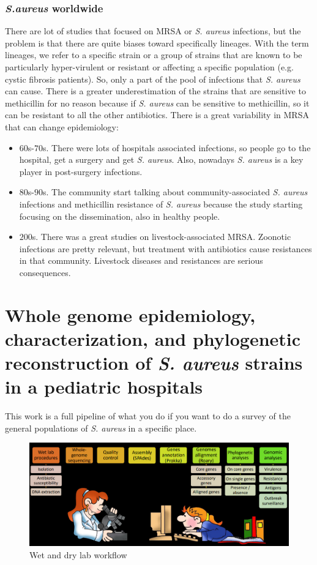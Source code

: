 \subsubsection{\emph{S.aureus} worldwide}
There are lot of studies that focused on MRSA or \emph{S. aureus} infections, but the problem is that there are quite biases toward specifically lineages. With the term lineages, we refer to a specific strain or a group of strains that are known to be particularly hyper-virulent or resistant or affecting a specific population (e.g. cystic fibrosis patients). So, only a part of the pool of infections that \emph{S. aureus} can cause. There is a greater underestimation of the strains that are sensitive to methicillin for no reason because if \emph{S. aureus} can be sensitive to methicillin, so it can be resistant to all the other antibiotics. 
There is a great variability in MRSA that can change epidemiology:
\begin{itemize}
    \item $60$s-$70$s. There were lots of hospitals associated infections, so people go to the hospital, get a surgery and get \emph{S. aureus}. Also, nowadays \emph{S. aureus} is a key player in post-surgery infections. 
    \item $80$s-$90$s. The community start talking about community-associated \emph{S. aureus} infections and methicillin resistance of \emph{S. aureus} because the study starting focusing on the dissemination, also in healthy people.
    \item $200$s. There was a great studies on livestock-associated MRSA. Zoonotic infections are pretty relevant, but treatment with antibiotics cause resistances in that community. Livestock diseases and resistances are serious consequences.  
\end{itemize}

\section{Whole genome epidemiology, characterization, and phylogenetic reconstruction of \emph{S. aureus} strains in a pediatric hospitals}

This work is a full pipeline of what you do if you want to do a survey of the general populations of \emph{S. aureus} in a specific place. 

\begin{figure}[h]
\centering
\caption{}
\includegraphics[width=1.0\textwidth]{Workflow.png}
\caption{Wet and dry lab workflow}
\end{figure}

